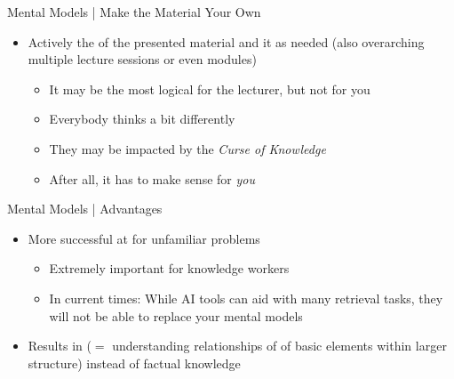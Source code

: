 \documentclass{ercisbeamer}
\begin{document}
\begin{frame}{Mental Models | Make the Material Your Own}
    \begin{tbox}
        \begin{itemize}
            \item Actively  the  of the presented material and  it as needed (also overarching multiple lecture sessions or even modules)
            \begin{itemize}
                \item It may be the most logical for the lecturer, but not for you
                \item Everybody thinks a bit differently
                \item They may be impacted by the \emph{Curse of Knowledge}
                \item After all, it has to make sense for \emph{you}
            \end{itemize}
        \end{itemize}
    \end{tbox}
\end{frame}
\setbgimage{}

\begin{frame}{Mental Models | Advantages}
    \begin{itemize}
        \item More successful at  for unfamiliar problems
        \begin{itemize}
            \item Extremely important for knowledge workers
            \item In current times: While AI tools  can aid with many retrieval tasks, they will not be able to replace your mental models 
        \end{itemize}
        \item Results in  ($=$ understanding relationships of of basic elements within larger structure) instead of factual knowledge
    \end{itemize}
\end{frame}
\end{document}
